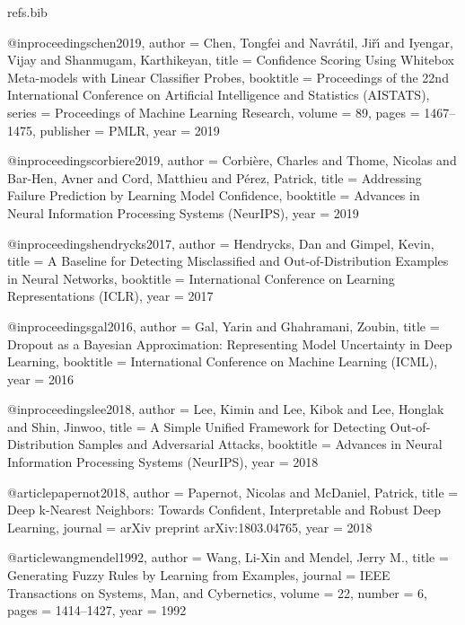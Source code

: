 \begin{filecontents*}[overwrite]{refs.bib}

@inproceedings{chen2019,
  author    = {Chen, Tongfei and Navr{\'a}til, Ji{\v{r}}{\'\i} and Iyengar, Vijay and Shanmugam, Karthikeyan},
  title     = {Confidence Scoring Using Whitebox Meta-models with Linear Classifier Probes},
  booktitle = {Proceedings of the 22nd International Conference on Artificial Intelligence and Statistics (AISTATS)},
  series    = {Proceedings of Machine Learning Research},
  volume    = {89},
  pages     = {1467--1475},
  publisher = {PMLR},
  year      = {2019}
}

@inproceedings{corbiere2019,
  author    = {Corbi{\`e}re, Charles and Thome, Nicolas and Bar-Hen, Avner and Cord, Matthieu and P{\'e}rez, Patrick},
  title     = {Addressing Failure Prediction by Learning Model Confidence},
  booktitle = {Advances in Neural Information Processing Systems (NeurIPS)},
  year      = {2019}
}

@inproceedings{hendrycks2017,
  author    = {Hendrycks, Dan and Gimpel, Kevin},
  title     = {A Baseline for Detecting Misclassified and Out-of-Distribution Examples in Neural Networks},
  booktitle = {International Conference on Learning Representations (ICLR)},
  year      = {2017}
}

@inproceedings{gal2016,
  author    = {Gal, Yarin and Ghahramani, Zoubin},
  title     = {Dropout as a {B}ayesian Approximation: Representing Model Uncertainty in Deep Learning},
  booktitle = {International Conference on Machine Learning (ICML)},
  year      = {2016}
}

@inproceedings{lee2018,
  author    = {Lee, Kimin and Lee, Kibok and Lee, Honglak and Shin, Jinwoo},
  title     = {A Simple Unified Framework for Detecting Out-of-Distribution Samples and Adversarial Attacks},
  booktitle = {Advances in Neural Information Processing Systems (NeurIPS)},
  year      = {2018}
}

@article{papernot2018,
  author  = {Papernot, Nicolas and McDaniel, Patrick},
  title   = {Deep k-Nearest Neighbors: Towards Confident, Interpretable and Robust Deep Learning},
  journal = {arXiv preprint arXiv:1803.04765},
  year    = {2018}
}

@article{wangmendel1992,
  author  = {Wang, Li-Xin and Mendel, Jerry M.},
  title   = {Generating Fuzzy Rules by Learning from Examples},
  journal = {IEEE Transactions on Systems, Man, and Cybernetics},
  volume  = {22},
  number  = {6},
  pages   = {1414--1427},
  year    = {1992}
}


\end{filecontents*}

